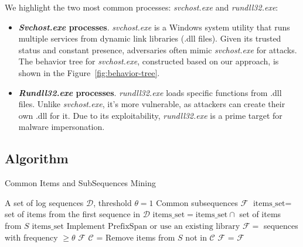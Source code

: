 We highlight the two most common processes: \textit{svchost.exe} and \textit{rundll32.exe}:
\begin{itemize}
    \item \textbf{\textit{Svchost.exe} processes}. \textit{svchost.exe} is a Windows system utility that runs multiple services from dynamic link libraries (.dll files). Given its trusted status and constant presence, adversaries often mimic \textit{svchost.exe} for attacks. The behavior tree for \textit{svchost.exe}, constructed based on our approach, is shown in the Figure~\ref{fig:behavior-tree}.
    \item \textbf{\textit{Rundll32.exe} processes}. \textit{rundll32.exe} loads specific functions from .dll files. Unlike \textit{svchost.exe}, it's more vulnerable, as attackers can create their own .dll for it. Due to its exploitability, \textit{rundll32.exe} is a prime target for malware impersonation. 
\end{itemize}



\subsection{Algorithm}

\begin{algorithm}
\caption{Common Items and SubSequences Mining}
\label{alg:fre-common}
\begin{algorithmic}[1]
\Require A set of log sequences \( \mathcal{D} \), threshold \( \theta=1 \)
\Ensure Common subsequences \( \mathcal{F} \)
\Statex
{}
    \State \( \text{items\_set} = \) set of items from the first sequence in \( \mathcal{D} \)
        \State \( \text{items\_set} = \text{items\_set} \cap \) set of items from \(S\)
    \EndFor
    \State \Return \( \text{items\_set} \) 
\EndFunction
\Statex
{}
    \State \( \text{Implement PrefixSpan or use an existing library} \)
    \State \( \mathcal{F} = \) sequences with frequency \( \geq \theta \)
    \State \Return \( \mathcal{F} \)
\EndFunction
\Statex
{}
    \State \( \mathcal{C} \) = 
        \State Remove items from \(S\) not in \( \mathcal{C} \)
    \EndFor
    \State \( \mathcal{F} \) = 
    \State \Return \( \mathcal{F} \)
\EndFunction
\end{algorithmic}
\end{algorithm}


